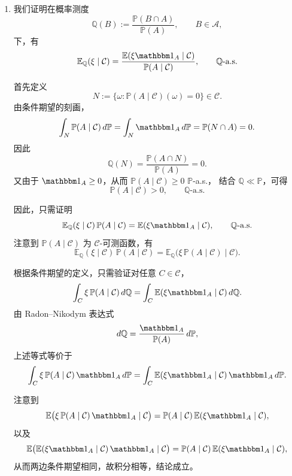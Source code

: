 \documentclass{ctexart}
\begin{document}
\begin{solution}
  \begin{enumerate}
    \item
      我们证明在概率测度
      \[
        \mathbb Q(B):=\frac{\mathbb P(B\cap A)}{\mathbb P(A)},\qquad B\in\mathcal A,
      \]
      下，有
      \[
        \mathbb E_{\mathbb Q}(\xi\mid\mathcal C)
        =
        \frac{\mathbb E(\xi\mathbbm 1_A\mid\mathcal C)}{\mathbb P(A\mid\mathcal C)},
        \qquad \mathbb Q\text{-a.s.}
      \]

      首先定义
      \[
        N:=\{\omega:\mathbb P(A\mid\mathcal C)(\omega)=0\}\in\mathcal C.
      \]
      由条件期望的刻画，
      \[
        \int_N \mathbb P(A\mid\mathcal C)\,d\mathbb P
        =
        \int_N \mathbbm 1_A\,d\mathbb P
        =
        \mathbb P(N\cap A)=0.
      \]
      因此
      \[
        \mathbb Q(N)=\frac{\mathbb P(A\cap N)}{\mathbb P(A)}=0.
      \]
      又由于 $\mathbbm 1_A\ge 0$，从而
      $\mathbb P(A\mid\mathcal C)\ge 0$ $\mathbb P$-a.s.，
      结合 $\mathbb Q\ll\mathbb P$，可得
      \[
        \mathbb P(A\mid\mathcal C)>0,\qquad \mathbb Q\text{-a.s.}
      \]

      因此，只需证明
      \[
        \mathbb E_{\mathbb Q}(\xi\mid\mathcal C)\,
        \mathbb P(A\mid\mathcal C)
        =
        \mathbb E(\xi\mathbbm 1_A\mid\mathcal C),
        \qquad \mathbb Q\text{-a.s.}
      \]
      注意到 $\mathbb P(A\mid\mathcal C)$ 为 $\mathcal C$-可测函数，有
      \[
        \mathbb E_{\mathbb Q}(\xi\mid\mathcal C)\,
        \mathbb P(A\mid\mathcal C)
        =
        \mathbb E_{\mathbb Q}\bigl(\xi\,\mathbb P(A\mid\mathcal C)\mid\mathcal C\bigr).
      \]

      根据条件期望的定义，只需验证对任意 $C\in\mathcal C$，
      \[
        \int_C \xi\,\mathbb P(A\mid\mathcal C)\,d\mathbb Q
        =
        \int_C \mathbb E(\xi\mathbbm 1_A\mid\mathcal C)\,d\mathbb Q.
      \]
      由 Radon--Nikodym 表达式
      \[
        d\mathbb Q=\frac{\mathbbm 1_A}{\mathbb P(A)}\,d\mathbb P,
      \]
      上述等式等价于
      \[
        \int_C \xi\,\mathbb P(A\mid\mathcal C)\,\mathbbm 1_A\,d\mathbb P
        =
        \int_C \mathbb E(\xi\mathbbm 1_A\mid\mathcal C)\,\mathbbm 1_A\,d\mathbb P.
      \]

      注意到
      \[
        \mathbb E\bigl(\xi\,\mathbb P(A\mid\mathcal C)\,\mathbbm 1_A\mid\mathcal C\bigr)
        =
        \mathbb P(A\mid\mathcal C)\,
        \mathbb E(\xi\mathbbm 1_A\mid\mathcal C),
      \]
      以及
      \[
        \mathbb E\bigl(\mathbb E(\xi\mathbbm 1_A\mid\mathcal C)\,\mathbbm 1_A\mid\mathcal C\bigr)
        =
        \mathbb P(A\mid\mathcal C)\,
        \mathbb E(\xi\mathbbm 1_A\mid\mathcal C),
      \]
      从而两边条件期望相同，故积分相等，结论成立。


\end{enumerate}
\end{solution}
\end{document}
